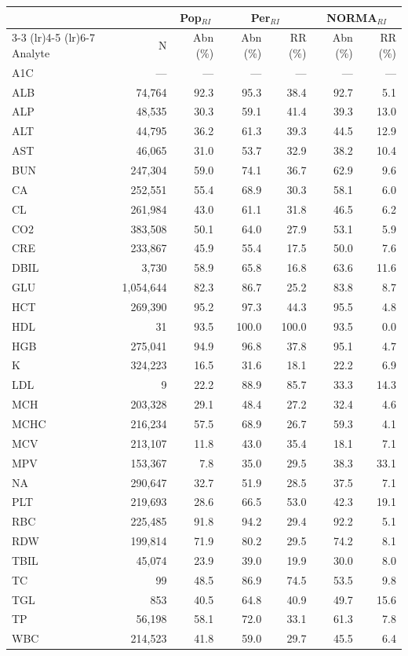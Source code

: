\begin{table}[ht]
\centering
\footnotesize
\begin{tabular}{lrrrrrr}
\toprule
 & & \multicolumn{1}{c}{Pop$_{RI}$} & \multicolumn{2}{c}{Per$_{RI}$} & \multicolumn{2}{c}{NORMA$_{RI}$} \\
\cmidrule(lr){3-3} \cmidrule(lr){4-5} \cmidrule(lr){6-7}
Analyte & N & Abn (\%) & Abn (\%) & RR (\%) & Abn (\%) & RR (\%) \\
\midrule
A1C & --- & --- & --- & --- & --- & --- \\
ALB & 74,764 & 92.3 & 95.3 & 38.4 & 92.7 & 5.1 \\
ALP & 48,535 & 30.3 & 59.1 & 41.4 & 39.3 & 13.0 \\
ALT & 44,795 & 36.2 & 61.3 & 39.3 & 44.5 & 12.9 \\
AST & 46,065 & 31.0 & 53.7 & 32.9 & 38.2 & 10.4 \\
BUN & 247,304 & 59.0 & 74.1 & 36.7 & 62.9 & 9.6 \\
CA & 252,551 & 55.4 & 68.9 & 30.3 & 58.1 & 6.0 \\
CL & 261,984 & 43.0 & 61.1 & 31.8 & 46.5 & 6.2 \\
CO2 & 383,508 & 50.1 & 64.0 & 27.9 & 53.1 & 5.9 \\
CRE & 233,867 & 45.9 & 55.4 & 17.5 & 50.0 & 7.6 \\
DBIL & 3,730 & 58.9 & 65.8 & 16.8 & 63.6 & 11.6 \\
GLU & 1,054,644 & 82.3 & 86.7 & 25.2 & 83.8 & 8.7 \\
HCT & 269,390 & 95.2 & 97.3 & 44.3 & 95.5 & 4.8 \\
HDL & 31 & 93.5 & 100.0 & 100.0 & 93.5 & 0.0 \\
HGB & 275,041 & 94.9 & 96.8 & 37.8 & 95.1 & 4.7 \\
K & 324,223 & 16.5 & 31.6 & 18.1 & 22.2 & 6.9 \\
LDL & 9 & 22.2 & 88.9 & 85.7 & 33.3 & 14.3 \\
MCH & 203,328 & 29.1 & 48.4 & 27.2 & 32.4 & 4.6 \\
MCHC & 216,234 & 57.5 & 68.9 & 26.7 & 59.3 & 4.1 \\
MCV & 213,107 & 11.8 & 43.0 & 35.4 & 18.1 & 7.1 \\
MPV & 153,367 & 7.8 & 35.0 & 29.5 & 38.3 & 33.1 \\
NA & 290,647 & 32.7 & 51.9 & 28.5 & 37.5 & 7.1 \\
PLT & 219,693 & 28.6 & 66.5 & 53.0 & 42.3 & 19.1 \\
RBC & 225,485 & 91.8 & 94.2 & 29.4 & 92.2 & 5.1 \\
RDW & 199,814 & 71.9 & 80.2 & 29.5 & 74.2 & 8.1 \\
TBIL & 45,074 & 23.9 & 39.0 & 19.9 & 30.0 & 8.0 \\
TC & 99 & 48.5 & 86.9 & 74.5 & 53.5 & 9.8 \\
TGL & 853 & 40.5 & 64.8 & 40.9 & 49.7 & 15.6 \\
TP & 56,198 & 58.1 & 72.0 & 33.1 & 61.3 & 7.8 \\
WBC & 214,523 & 41.8 & 59.0 & 29.7 & 45.5 & 6.4 \\
\bottomrule
\end{tabular}
\label{tab:07_prevalence_detail_eicu}
\end{table}